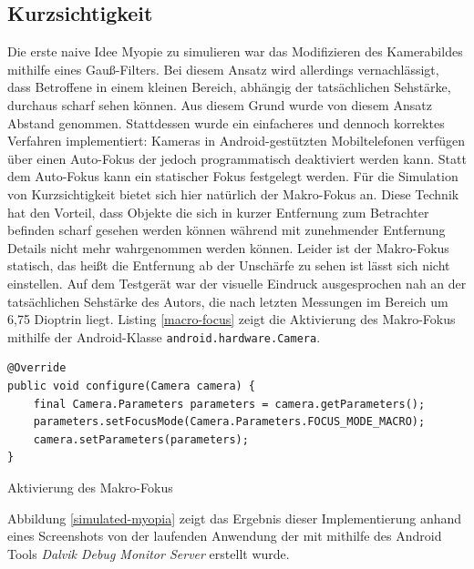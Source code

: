 \documentclass[a4paper]{article}
\begin{document}
\subsection*{Kurzsichtigkeit}
Die erste naive Idee Myopie zu simulieren war das Modifizieren des Kamerabildes mithilfe eines Gauß-Filters. Bei diesem Ansatz wird allerdings vernachlässigt, dass Betroffene in einem kleinen Bereich, abhängig der tatsächlichen Sehstärke, durchaus scharf sehen können. Aus diesem Grund wurde von diesem Ansatz Abstand genommen. Stattdessen wurde ein einfacheres und dennoch korrektes Verfahren implementiert: Kameras in Android-gestützten Mobiltelefonen verfügen über einen Auto-Fokus der jedoch programmatisch deaktiviert werden kann. Statt dem Auto-Fokus kann ein statischer Fokus festgelegt werden. Für die Simulation von Kurzsichtigkeit bietet sich hier natürlich der Makro-Fokus an. Diese Technik hat den Vorteil, dass Objekte die sich in kurzer Entfernung zum Betrachter befinden scharf gesehen werden können während mit zunehmender Entfernung Details nicht mehr wahrgenommen werden können. Leider ist der Makro-Fokus statisch, das heißt die Entfernung ab der Unschärfe zu sehen ist lässt sich nicht einstellen. Auf dem Testgerät war der visuelle Eindruck ausgesprochen nah an der tatsächlichen Sehstärke des Autors, die nach letzten Messungen im Bereich um 6,75 Dioptrin liegt. Listing \ref{macro-focus} zeigt die Aktivierung des Makro-Fokus mithilfe der Android-Klasse \texttt{android.hardware.Camera}.

\begin{listing}[H]
\begin{verbatim}
@Override
public void configure(Camera camera) {
    final Camera.Parameters parameters = camera.getParameters();
    parameters.setFocusMode(Camera.Parameters.FOCUS_MODE_MACRO);
    camera.setParameters(parameters);
}
\end{verbatim}
\caption{Aktivierung des Makro-Fokus}
\label{macro-focus}
\end{listing}

Abbildung \ref{simulated-myopia} zeigt das Ergebnis dieser Implementierung anhand eines Screenshots von der laufenden Anwendung der mit mithilfe des Android Tools \textit{Dalvik Debug Monitor Server} erstellt wurde.
\end{document}
